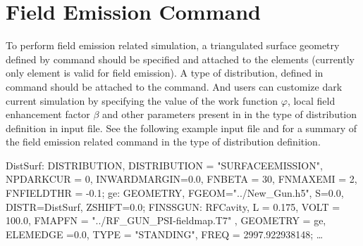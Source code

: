 \section{Field Emission Command}
\label{sec:FieldEmissionCmd}
To perform field emission related simulation, a triangulated surface geometry defined by  command  should be specified and attached to the elements (currently only  element is valid for field emission). A  type of distribution, defined in  command should be attached to the  command. And users can customize dark current simulation by specifying the value of the work
function $\varphi$, local field enhancement factor $\beta$ and other parameters
present in  in the  type of distribution definition in input file. See the following example input file and  for a summary of the field emission related command in the  type of distribution definition.\\
\begin{example}
DistSurf: DISTRIBUTION, DISTRIBUTION = "SURFACEEMISSION",
          NPDARKCUR = 0, INWARDMARGIN=0.0,
          FNBETA = 30, FNMAXEMI = 2,
          FNFIELDTHR = -0.1;
ge:       GEOMETRY, FGEOM="../New_Gun.h5",
          S=0.0, DISTR=DistSurf,
          ZSHIFT=0.0;
FINSSGUN: RFCavity, L = 0.175,
          VOLT = 100.0, FMAPFN = "../RF_GUN_PSI-fieldmap.T7" ,
          GEOMETRY = ge, ELEMEDGE =0.0,
          TYPE = "STANDING", FREQ = 2997.922938148;
\ldots
\end{example}

